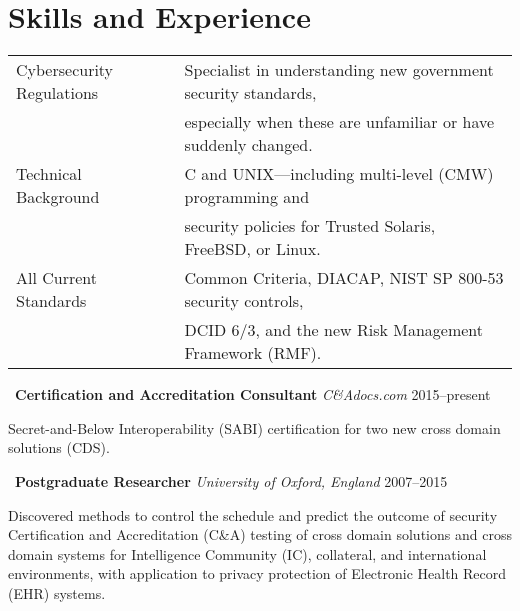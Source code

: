\section*{Skills and Experience}

\vspace{-2mm}
\begin{tabular*}{\textwidth}{ll}
    \hline
    \rule{0pt}{5mm}Cybersecurity Regulations & Specialist in understanding
        new government security standards, \\
        & especially when these are unfamiliar or have suddenly changed.
            \vspace{1.5mm} \\

    Technical Background & C and UNIX---including multi-level (CMW) programming and \\
        & security policies for Trusted Solaris, FreeBSD, or Linux. \vspace{1.5mm} \\

    \rule[-2mm]{0pt}{1em}All Current Standards & Common Criteria,
        DIACAP, NIST SP 800-53 security controls, \\
        & \rule[-3mm]{0pt}{0pt}DCID 6/3, and the new Risk Management Framework (RMF). \\

    \hline
\end{tabular*}

\vspace{2mm}
\noindent\textbullet\ \textbf{Certification and Accreditation Consultant}
    \hfill \emph{C\&Adocs.com} \hfill 2015--present

    \vspace{1mm}
    \noindent Secret-and-Below Interoperability (SABI) certification
    for two new cross domain solutions (CDS).

\vspace{1.5mm}
\noindent\textbullet\ \textbf{Postgraduate Researcher}
    \hfill \emph{University of Oxford, England} \hfill 2007--2015

    \vspace{1mm}
    \noindent Discovered methods to control the schedule and predict the
    outcome of security Certification and Accreditation (C\&A)
    testing of cross domain solutions and cross domain systems for
    Intelligence Community (IC), collateral, and international
    environments, with application to privacy protection
    of Electronic Health Record (EHR) systems.

